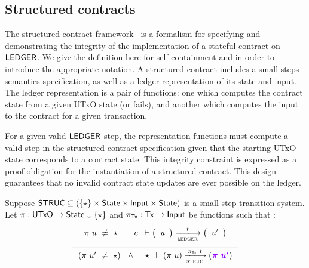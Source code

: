 \subsection{Structured contracts}
\label{sec:struc}

The structured contract framework~\cite{structured} is a formalism for specifying and demonstrating
the integrity of the implementation of a stateful contract on $\mathsf{LEDGER}$.
We give the definition here for self-containment and in order to introduce the
appropriate notation.
A structured contract includes a small-steps semantics specification, as well as
a ledger representation of its state and input. The ledger representation
is a pair of functions: one which computes the contract state from
a given UTxO state (or fails), and another which computes the input to the contract
for a given transaction.

For a given valid $\mathsf{LEDGER}$ step, the representation functions must compute a
valid step in the structured contract specification given that the starting
UTxO state corresponds to a contract state. This integrity constraint is
expressed as a proof obligation for the instantiation of a structured contract.
This design guarantees that no invalid contract state updates are ever possible
on the ledger.

Suppose $\mathsf{STRUC} \subseteq (\{\star\} \times \mathsf{State} \times \mathsf{Input} \times \mathsf{State})$
is a small-step transition system.
Let $\pi : \mathsf{UTxO} \to \mathsf{State} \cup \{\star\}$ and $\pi_{\mathsf{Tx}} : \mathsf{Tx} \to \mathsf{Input}$
be functions such that :
\begin{equation*}
\inference
{
    \\~\\
    \pi~u~ \neq~ \emptytype &
    {
    \begin{array}{c}
        e\\
    \end{array}
    }
    \vdash
    {
    \left(
        \begin{array}{r}
        \var{u} \\
        \end{array}
    \right)
    }
    \trans{ledger}{\var{t}}
    {
    \left(
        \begin{array}{r}
        \var{u'} \\
        \end{array}
    \right)
    }
    \\~\\
}
{
    (\pi~u'~ \neq~ \emptytype) ~~\wedge~~
    \begin{array}{r}
    \emptytype \\
    \end{array}
\vdash
    (\pi~u)
    \trans{struc}{\pi_{\Tx}~t}
    (\varUpdate{\pi~u'})
}
\end{equation*}

